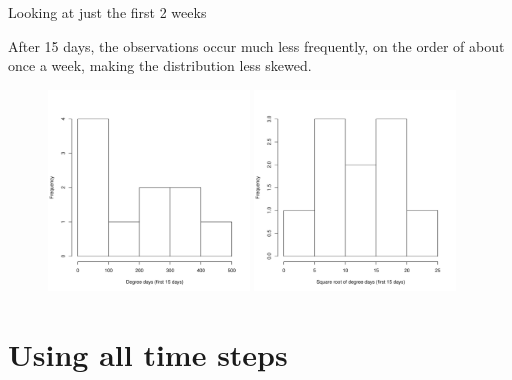 \documentclass{beamer}
\begin{document}
\begin{frame}{Looking at just the first 2 weeks}

  {\scriptsize
    \noindent After 15 days, the observations occur much less frequently, on the order of about once a week, making the distribution less skewed.
    
\begin{figure}
  \includegraphics[width=2.1in]{degdays_first_two_weeks_hist}
  \includegraphics[width=2.1in]{sqrt_degdays_first_two_weeks_hist}
\end{figure}
  }
  
\end{frame}



\section[All time steps]{Using all time steps}
\end{document}
